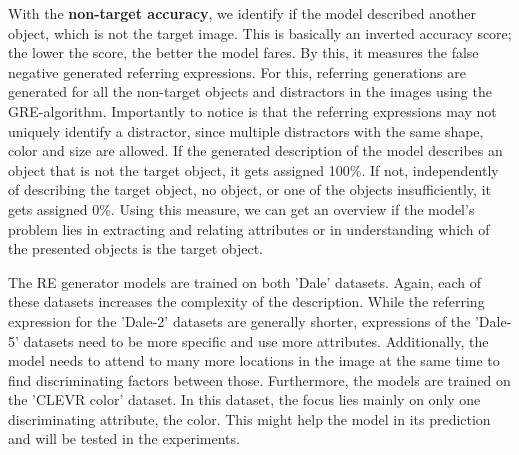 With the \textbf{non-target accuracy}, we identify if the model described another object, which is not the target image.
This is basically an inverted accuracy score; the lower the score, the better the model fares.
By this, it measures the false negative generated referring expressions.
For this, referring generations are generated for all the non-target objects and distractors in the images using the GRE-algorithm.
Importantly to notice is that the referring expressions may not uniquely identify a distractor, since multiple distractors with the same shape, color and size are allowed.
If the generated description of the model describes an object that is not the target object, it gets assigned 100\%.
If not, independently of describing the target object, no object, or one of the objects insufficiently, it gets assigned 0\%.
Using this measure, we can get an overview if the model's problem lies in extracting and relating attributes or in understanding which of the presented objects is the target object.

The RE generator models are trained on both 'Dale' datasets.
Again, each of these datasets increases the complexity of the description.
While the referring expression for the 'Dale-2' datasets are generally shorter, expressions of the 'Dale-5' datasets need to be more specific and use more attributes.
Additionally, the model needs to attend to many more locations in the image at the same time to find discriminating factors between those.
Furthermore, the models are trained on the 'CLEVR color' dataset.
In this dataset, the focus lies mainly on only one discriminating attribute, the color.
This might help the model in its prediction and will be tested in the experiments.

